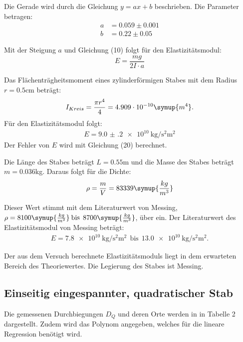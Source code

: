 Die Gerade wird durch die Gleichung $y = ax + b$ beschrieben. Die Parameter betragen:
\begin{align*}
  a &= 0.059 \pm 0.001 \\
  b &= 0.22  \pm 0.05
\end{align*}

Mit der Steigung $a$ und Gleichung (10) folgt für den Elastizitätsmodul:
\begin{equation}
  E = \frac{mg}{2I \cdot a}
\end{equation}

Das Flächenträgheitsmoment eines zylinderförmigen Stabes mit dem Radius
$r = 0.5$cm beträgt:
\begin{equation}
  I_{Kreis} = \frac{\pi r^4}{4} = 4.909 \cdot 10^{-10} \symup{m^4} .
\end{equation}
Für den Elastizitätsmodul folgt:
\begin{align*}
  E = \SI{9.0(2)e10}{\kilo\gram\per\second\squared\square\meter}
\end{align*}
Der Fehler von $E$ wird mit Gleichung (20) berechnet.

Die Länge des Stabes beträgt $L = 0.55$m und die Masse des Stabes beträgt $m = 0.036$kg.
Daraus folgt für die Dichte:
\begin{equation}
  \rho = \frac{m}{V} = 83339 \symup{\frac{kg}{m^3}}
\end{equation}

Dieser Wert stimmt mit dem Literaturwert von Messing, $\rho =8100\symup{\frac{kg}{m^3}}\: \text{bis}\:\: 8700\symup{\frac{kg}{m^3}}$,
über ein.
Der Literaturwert des Elastizitätsmodul von Messing beträgt:
\begin{align*}
  E = \SI{7.8e10}{\kilo\gram\per\second\squared\square\meter} \:\: \text{bis} \:\:
  \SI{13.0e10}{\kilo\gram\per\second\squared\square\meter} .
\end{align*}

Der aus dem Versuch berechnete Elastizitätsmoduls liegt in dem erwarteten Bereich des Theoriewertes.
Die Legierung des Stabes ist Messing.

\subsection{Einseitig eingespannter, quadratischer Stab}
Die gemessenen Durchbiegungen $D_Q$ und deren Orte werden in in Tabelle 2 dargestellt. Zudem wird
das Polynom angegeben, welches für die lineare Regression benötigt wird.

